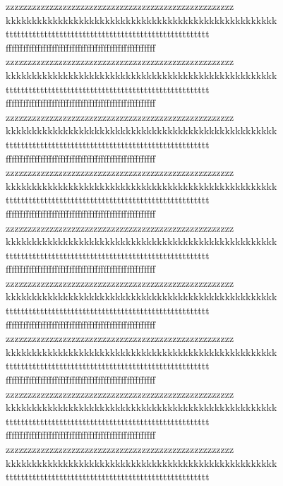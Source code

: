 \documentclass[a4paper,12pt,landscape,twocolumn]{book}
\begin{document}
zzzzzzzzzzzzzzzzzzzzzzzzzzzzzzzzzzzzzzzzzzzzzzzzzzzz
kkkkkkkkkkkkkkkkkkkkkkkkkkkkkkkkkkkkkkkkkkkkkkkkkkkk
ttttttttttttttttttttttttttttttttttttttttttttttttttttt
ffffffffffffffffffffffffffffffffffffffffffffffffffff
zzzzzzzzzzzzzzzzzzzzzzzzzzzzzzzzzzzzzzzzzzzzzzzzzzzz
kkkkkkkkkkkkkkkkkkkkkkkkkkkkkkkkkkkkkkkkkkkkkkkkkkkk
ttttttttttttttttttttttttttttttttttttttttttttttttttttt
ffffffffffffffffffffffffffffffffffffffffffffffffffff
zzzzzzzzzzzzzzzzzzzzzzzzzzzzzzzzzzzzzzzzzzzzzzzzzzzz
kkkkkkkkkkkkkkkkkkkkkkkkkkkkkkkkkkkkkkkkkkkkkkkkkkkk
ttttttttttttttttttttttttttttttttttttttttttttttttttttt
ffffffffffffffffffffffffffffffffffffffffffffffffffff
zzzzzzzzzzzzzzzzzzzzzzzzzzzzzzzzzzzzzzzzzzzzzzzzzzzz
kkkkkkkkkkkkkkkkkkkkkkkkkkkkkkkkkkkkkkkkkkkkkkkkkkkk
ttttttttttttttttttttttttttttttttttttttttttttttttttttt
ffffffffffffffffffffffffffffffffffffffffffffffffffff
zzzzzzzzzzzzzzzzzzzzzzzzzzzzzzzzzzzzzzzzzzzzzzzzzzzz
kkkkkkkkkkkkkkkkkkkkkkkkkkkkkkkkkkkkkkkkkkkkkkkkkkkk
ttttttttttttttttttttttttttttttttttttttttttttttttttttt
ffffffffffffffffffffffffffffffffffffffffffffffffffff
zzzzzzzzzzzzzzzzzzzzzzzzzzzzzzzzzzzzzzzzzzzzzzzzzzzz
kkkkkkkkkkkkkkkkkkkkkkkkkkkkkkkkkkkkkkkkkkkkkkkkkkkk
ttttttttttttttttttttttttttttttttttttttttttttttttttttt
ffffffffffffffffffffffffffffffffffffffffffffffffffff
zzzzzzzzzzzzzzzzzzzzzzzzzzzzzzzzzzzzzzzzzzzzzzzzzzzz
kkkkkkkkkkkkkkkkkkkkkkkkkkkkkkkkkkkkkkkkkkkkkkkkkkkk
ttttttttttttttttttttttttttttttttttttttttttttttttttttt
ffffffffffffffffffffffffffffffffffffffffffffffffffff
zzzzzzzzzzzzzzzzzzzzzzzzzzzzzzzzzzzzzzzzzzzzzzzzzzzz
kkkkkkkkkkkkkkkkkkkkkkkkkkkkkkkkkkkkkkkkkkkkkkkkkkkk
ttttttttttttttttttttttttttttttttttttttttttttttttttttt
ffffffffffffffffffffffffffffffffffffffffffffffffffff
zzzzzzzzzzzzzzzzzzzzzzzzzzzzzzzzzzzzzzzzzzzzzzzzzzzz
kkkkkkkkkkkkkkkkkkkkkkkkkkkkkkkkkkkkkkkkkkkkkkkkkkkk
ttttttttttttttttttttttttttttttttttttttttttttttttttttt
\end{document}

